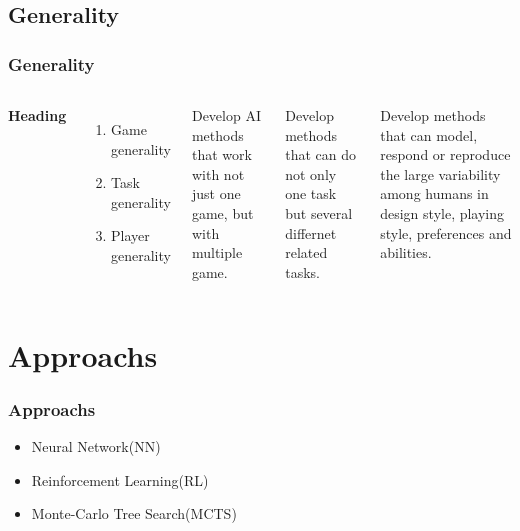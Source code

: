 \documentclass{beamer}
\begin{document}
\subsection{Generality}
\begin{frame}
\frametitle{Generality\cite{4}}
\begin{columns}[c] %

\textbf{Heading}
\begin{enumerate}
\item Game generality
\item Task generality
\item Player generality 
\end{enumerate}


Develop AI methods that work with not just one game, but with multiple game.

Develop methods that can do not only one task but several differnet related tasks.

Develop methods that can model, respond or reproduce the large variability among humans in design style, playing style, preferences and abilities.
\end{columns}
\end{frame}

\section{Approachs}
\begin{frame}
  \frametitle{Approachs}
  \begin{itemize}
    \item Neural Network(NN)
    \item Reinforcement Learning(RL)
    \item Monte-Carlo Tree Search(MCTS)
  \end{itemize}
\end{frame}
\end{document}
